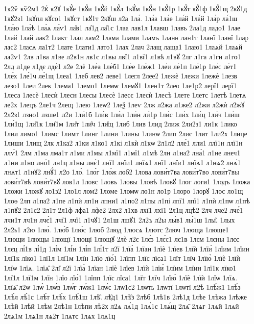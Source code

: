 {1к2ѷ
кѷ2м1
2кⷮ
к2ꙋ
1кꙋ́е
1кꙋ́и
1кꙋ́й
1кꙋ́л
1кꙋ́м
1кꙋ́н
1кꙋ́1р
1кꙋ́т
кꙋ́1ф
1кꙋ́1щ
2кꙋ1д
1кꙋ2з1
1кꙋпл
кꙋсо1
1кꙋст
1кꙋ1т
2кꙋш
л2а
1ла́.
1ла́а
1ла́е
1ла́й
1ла́й
1ла́р
ла́1ш
1ла́ю
1ла́ѣ
1ла́ѧ
ла́ѵ1
ла̑в1
ла̑1д
ла̑1с
1лаа
лав1л
1лавш
1лавъ
2ла1д
ладо1
1лае
1лай
1лай
лак2
1лакт
1лал
лам2
1лама
1лами
1ламъ
1ланн
лан1т
1ланї
1ланї
1лар
лас2
1ласѧ
ла1т2
1лате
1лати1
лато1
1лах
2лач
2лащ
лаща1
1лаю1
1лаѧй
1лаѧй
ла2ѵ1
2лв
л1ва
л1ве
л2в1н
лв1с
л1вы
лвї1
л1вї1
л1вѣ
л1вꙋ
2лг
л1га
л1ги
л1го1
2лд
л1де
л1дє
лдє́1
л2е
2лѐ
1ле́а
1ле́б1
1ле́е
1ле́ж1
1ле́и
ле́1п
1ле́1р
1ле́с
ле́т1
1ле́х
1ле́1ч
ле́1щ
1леа1
1леб
лев2
леве1
1легл
2лее2
1лежѐ
1лежи
1лежѐ
1лезв
лезо1
1леи
2лек
1лема1
1лемо1
1лемѡ
1лемꙋ1
1лен1т
2лео
1ле1р2
лерї1
лерї1
1леса
1лесѐ
1лесѝ
1лесн
1лесы
1лесѐ
1лесє
1лесѝ
1лесѣ
1лете
1летс
1летѣ
1летѧ
ле2х
1лецъ
2ле1ч
2лещ
1лею
1леѡ2
1леѯ
1леѵ
2лж
л2жа
л1же2
л2жи
л2жѝ
л2жꙋ
2л2з1
лзно1
лзше1
л2и
1ли́1б
1ли́в
1ли́л
1ли́н
ли́1р
1ли́с
1ли́х
1ли́ц
1ли́ч
1ли́ш
1ли́1щ
1ли̑1к
1ли̑1м
1ли̑т
1ли̑ч
1ли̑щ
1либ
1лив
1лид
2лиж
2ли2з1
ли1к
1лико
1лил
лимо1
1лимс
1лимт
1линг
1лини
1лины
1линѡ
2лип
2лис
1лит
1ли2х
1лице
1лиши
1лищ
2лк
л1ка2
л1ки
л1ко1
л1кі
л1кѝ
л1кѡ
2л1л2
лле́1
лли1
ллї1н
ллї1н
ллѵ́1
2лм
л1ма
лма1т
л1ми
л1мы
л1мї1
л1мї1
л1мѣ
2лн
л1на2
лна́1
л1не
лнеч1
л1ни
л1но
лно́1
лн1ц
л1ны
лнє́1
лнї1
лнїи1
лнїѧ1
лнї1
лнїи1
лнїѧ1
л1нѧ2
лнѧ́1
лнѧт1
л1нꙋ2
лнꙋ́1
л2о
1ло́.
1ло́г
1ло́ж
лоб2
1лова
лови́т7ва
лови́т7во
лови́т7вы
лови́т7вѣ
лови́т7вꙋ
лов1л
1ловс
1ловъ
1ловы
1ловѣ
1ловꙋ
1лог
логи1
1лодъ
1ложа
1ложи
1ложꙋ
ло1з2
1ло1л
лом2
1ломе
1ломѡ
ло1н
ло1р
1лоро
1лорꙋ
1лос
ло1щ
1лоѳ
2лп
л1па2
л1пе
л1пѝ
лп1н
лпни1
л1по2
л1пы
л1пі
лпї1
лпї1
л1пѝ
л1пѡ
л1пѣ
л1пꙋ2
2л1с2
2л1т
2л1ф
лфа1
лфе2
2лх2
л1хв
лхї1
лхї1
2л1ц
лцѣ2
2лч
лче2
лче́1
лчи1т
лч1н
лчє́1
лчї1
лчї1
л1чꙋ1
2л1ш
лшꙋ1
2л2ъ
л2ы
лы́в1
лы́1ш
1лы̑.
1лых
2л2ь1
л2ю
1лю́.
1лю́б
1лю́с
1люб
2люд
1люсѧ
1лютс
2люч
1люща
1люще1
1лющи
1лющы
1лющї
1лющї
1лющꙋ
2лѐ
л2є
1лє́з
1лє́с1
лє1в
1лєм
1лєны
1лєс
1лєц
лі́1в
лі́1д
1лі́м
1лі́н
1лі́п
1лі́1т
л2ї
1лїа̀
1лїан
1лїѐ
1лїев
1лїѝ
1лїи́
1лїим
1лїин
1лї1к
лїко1
1лї1л
1лї1м
1лїн
1лїо
лїо́1
1лїпп
1лїс
лїса1
1лїт
1лїч
1лїю̀
1лїѐ
1лїѝ
1лїѡ
1лїѧ.
1лїѧ̑
2лі̑
л2ї
1лїа̀
1лїан
1лїѐ
1лїев
1лїѝ
1лїи́
1лїим
1лїин
1лї1к
лїко1
1лї1л
1лї1м
1лїн
1лїо
лїо́1
1лїпп
1лїс
лїса1
1лїт
1лїч
1лїю̀
1лїѐ
1лїѝ
1лїѡ
1лїѧ.
1лїѧ̑
л2ѡ
1лѡ̀
1лѡ́в
1лѡ́г
лѡ́ж1
1лѡ́с
1лѡ1с2
1лѡть
1лѡтї
1лѡтї
л2ѣ
1лѣ́ж1
1лѣ́з
1лѣ́л
лѣ́1с
1лѣ́т
1лѣ́х
1лѣ́1ш
1лѣ̑.
лѣ̑д1
1лѣ̑з
2лѣб
1лѣ1в
2лѣ1д
1лѣе
1лѣжа
1лѣже
1лѣй
1лѣй
1лѣм
2лѣ1н
1лѣпи
лѣ2х
л2ѧ
лѧ́1д
1лѧ́1с
1лѧ́щ
2лѧ̑
2лѧг
1лѧй
1лѧй
2лѧ1м
1лѧ1н
лѧ2т
1лѧтс
1лѧх
1лѧ1ц
}
